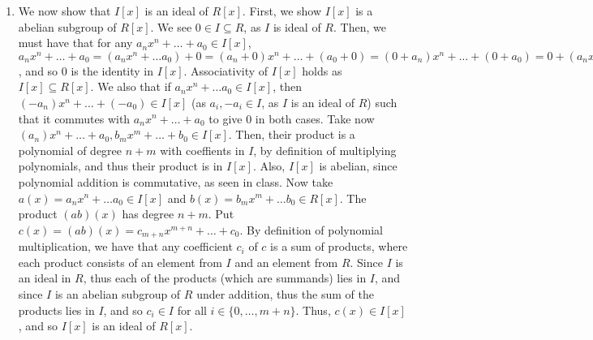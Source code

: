 \begin{enumerate}
\begin{enumerate}
		\item We now show that $I[x]$ is an ideal of $R[x]$. First, we show $I[x]$ is a abelian subgroup of $R[x]$. We see $0 \in I \subseteq R$, as $I$ is ideal of $R$. Then, we must have that for any $a_nx^n + \dots + a_0 \in I[x]$, $a_nx^n + \dots + a_0 = (a_nx^n + \dots a_0) + 0 = (a_n + 0)x^n + \dots + (a_0 + 0) = (0 + a_n)x^n + \dots + (0 + a_0) = 0 + (a_nx^n + \dots + a_0)$, and so $0$ is the identity in $I[x]$. Associativity of $I[x]$ holds as $I[x] \subseteq R[x]$. We also that if $a_nx^n + \dots a_0 \in I[x]$, then $(-a_n)x^n + \dots + (-a_0) \in I[x]$ (as $a_i,-a_i \in I$, as $I$ is an ideal of $R$) such that it commutes with $a_nx^n + \dots + a_0$ to give $0$ in both cases. Take now $(a_n)x^n + \dots + a_0, b_mx^m + \dots + b_0 \in I[x]$. Then, their product is a polynomial of degree $n+m$ with coeffients in $I$, by definition of multiplying polynomials, and thus their product is in $I[x]$. Also, $I[x]$ is abelian, since polynomial addition is commutative, as seen in class. Now take $a(x) = a_nx^n + \dots a_0 \in I[x]$ and $b(x) = b_mx^m + \dots b_0 \in R[x]$. The product $(ab)(x)$ has degree $n+m$. Put $c(x) = (ab)(x) = c_{m+n}x^{m+n} + \dots + c_{0}$. By definition of polynomial multiplication, we have that any coefficient $c_i$ of $c$ is a sum of products, where each product consists of an element from $I$ and an element from $R$. Since $I$ is an ideal in $R$, thus each of the products (which are summands) lies in $I$, and since $I$ is an abelian subgroup of $R$ under addition, thus the sum of the products lies in $I$, and so $c_i \in I$ for all $i \in \{0, \dots, m+n\}$. Thus, $c(x) \in I[x]$, and so $I[x]$ is an ideal of $R[x]$. 
	\end{enumerate}
\end{enumerate}


